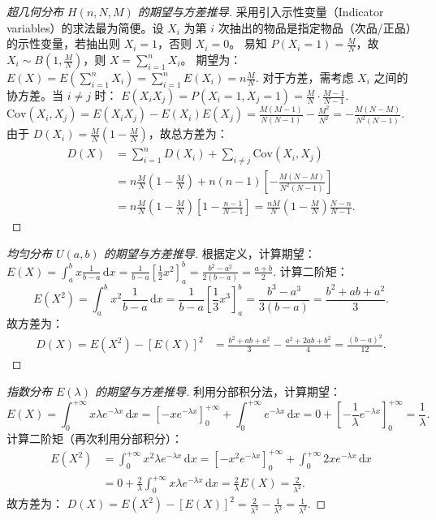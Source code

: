 \documentclass[lang=cn,11pt]{elegantbook}
\begin{document}
\begin{proof}[超几何分布 $H(n,N,M)$ 的期望与方差推导]
采用引入示性变量（Indicator variables）的求法最为简便。设 $X_i$ 为第 $i$ 次抽出的物品是指定物品（次品/正品）的示性变量，若抽出则 $X_i=1$，否则 $X_i=0$。
易知 $P(X_i=1) = \frac{M}{N}$，故 $X_i \sim B(1, \frac{M}{N})$，则 $X = \sum_{i=1}^n X_i$。
期望为：
\(
E(X) = E\left(\sum_{i=1}^n X_i\right) = \sum_{i=1}^n E(X_i) = n \frac{M}{N}.
\)
对于方差，需考虑 $X_i$ 之间的协方差。当 $i \neq j$ 时：
\(
E(X_i X_j) = P(X_i=1, X_j=1) = \frac{M}{N} \cdot \frac{M-1}{N-1}.
\)
\(
\mathrm{Cov}(X_i, X_j) = E(X_i X_j) - E(X_i)E(X_j) = \frac{M(M-1)}{N(N-1)} - \frac{M^2}{N^2} = -\frac{M(N-M)}{N^2(N-1)}.
\)
由于 $D(X_i) = \frac{M}{N}\left(1-\frac{M}{N}\right)$，故总方差为：
\[
\begin{aligned}
D(X) &= \sum_{i=1}^n D(X_i) + \sum_{i \neq j} \mathrm{Cov}(X_i, X_j) \\
&= n \frac{M}{N}\left(1-\frac{M}{N}\right) + n(n-1)\left[-\frac{M(N-M)}{N^2(N-1)}\right] \\
&= n \frac{M}{N}\left(1-\frac{M}{N}\right) \left[1 - \frac{n-1}{N-1}\right] = \frac{nM}{N}\left(1-\frac{M}{N}\right)\frac{N-n}{N-1}.
\end{aligned}
\]
\end{proof}

\begin{proof}[均匀分布 $U(a,b)$ 的期望与方差推导]
根据定义，计算期望：
\(
E(X) = \int_{a}^{b} x \frac{1}{b-a} \,\mathrm{d}x = \frac{1}{b-a} \left[ \frac{1}{2}x^2 \right]_{a}^{b} = \frac{b^2-a^2}{2(b-a)} = \frac{a+b}{2}.
\)
计算二阶矩：
\[
E(X^2) = \int_{a}^{b} x^2 \frac{1}{b-a} \,\mathrm{d}x = \frac{1}{b-a} \left[ \frac{1}{3}x^3 \right]_{a}^{b} = \frac{b^3-a^3}{3(b-a)} = \frac{b^2+ab+a^2}{3}.
\]
故方差为：
\[
\begin{aligned}
D(X) = E(X^2) - [E(X)]^2 &= \frac{b^2+ab+a^2}{3} - \frac{a^2+2ab+b^2}{4} = \frac{(b-a)^2}{12}.
\end{aligned}
\]
\end{proof}

\begin{proof}[指数分布 $E(\lambda)$ 的期望与方差推导]
利用分部积分法，计算期望：
\[
E(X) = \int_{0}^{+\infty} x \lambda e^{-\lambda x} \,\mathrm{d}x = \left[ -x e^{-\lambda x} \right]_{0}^{+\infty} + \int_{0}^{+\infty} e^{-\lambda x} \,\mathrm{d}x = 0 + \left[ -\frac{1}{\lambda} e^{-\lambda x} \right]_{0}^{+\infty} = \frac{1}{\lambda}.
\]
计算二阶矩（再次利用分部积分）：
\[
\begin{aligned}
E(X^2) &= \int_{0}^{+\infty} x^2 \lambda e^{-\lambda x} \,\mathrm{d}x = \left[ -x^2 e^{-\lambda x} \right]_{0}^{+\infty} + \int_{0}^{+\infty} 2x e^{-\lambda x} \,\mathrm{d}x \\
&= 0 + \frac{2}{\lambda} \int_{0}^{+\infty} x \lambda e^{-\lambda x} \,\mathrm{d}x = \frac{2}{\lambda} E(X) = \frac{2}{\lambda^2}.
\end{aligned}
\]
故方差为：
\(
D(X) = E(X^2) - [E(X)]^2 = \frac{2}{\lambda^2} - \frac{1}{\lambda^2} = \frac{1}{\lambda^2}.
\)
\end{proof}
\end{document}
